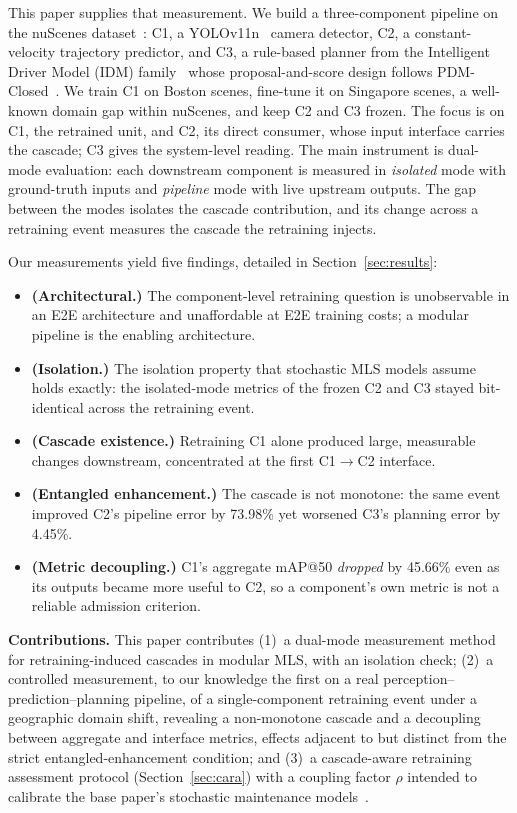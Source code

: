 \documentclass[conference]{IEEEtran}
\begin{document}
This paper supplies that measurement. We build a three-component pipeline on
the nuScenes dataset~\cite{caesar2020nuscenes}: C1, a
YOLOv11n~\cite{jocher2024yolo11} camera detector, C2, a constant-velocity
trajectory predictor, and C3, a rule-based planner from the Intelligent Driver
Model (IDM) family~\cite{treiber2000idm} whose proposal-and-score design
follows PDM-Closed~\cite{dauner2023parting}. We train C1 on Boston scenes,
fine-tune it on Singapore scenes, a well-known domain gap within nuScenes, and
keep C2 and C3 frozen. The focus is on C1, the retrained unit, and C2, its
direct consumer, whose input interface carries the cascade; C3 gives the
system-level reading. The main instrument is dual-mode evaluation: each
downstream component is measured in \emph{isolated} mode with ground-truth
inputs and \emph{pipeline} mode with live upstream outputs. The gap between the
modes isolates the cascade contribution, and its change across a retraining
event measures the cascade the retraining injects.

Our measurements yield five findings, detailed in Section~\ref{sec:results}:
\begin{itemize}
\item[\textbf{F1.}] \textbf{(Architectural.)} The component-level retraining
question is unobservable in an E2E architecture and unaffordable at E2E training
costs; a modular pipeline is the enabling architecture.
\item[\textbf{F2.}] \textbf{(Isolation.)} The isolation property that stochastic
MLS models assume holds exactly: the isolated-mode metrics of the frozen C2 and
C3 stayed bit-identical across the retraining event.
\item[\textbf{F3.}] \textbf{(Cascade existence.)} Retraining C1 alone produced
large, measurable changes downstream, concentrated at the first C1$\to$C2
interface.
\item[\textbf{F4.}] \textbf{(Entangled enhancement.)} The cascade is not
monotone: the same event improved C2's pipeline error by 73.98\% yet worsened
C3's planning error by 4.45\%.
\item[\textbf{F5.}] \textbf{(Metric decoupling.)} C1's aggregate mAP@50
\emph{dropped} by 45.66\% even as its outputs became more useful to C2, so a
component's own metric is not a reliable admission criterion.
\end{itemize}

\textbf{Contributions.} This paper contributes (1)~a dual-mode measurement
method for retraining-induced cascades in modular MLS, with an isolation
check; (2)~a controlled measurement, to our knowledge the first on a real
perception--prediction--planning pipeline, of a single-component retraining
event under a geographic domain shift, revealing a non-monotone cascade and a
decoupling between aggregate and interface metrics, effects adjacent to but
distinct from the strict entangled-enhancement condition; and (3)~a
cascade-aware retraining assessment protocol (Section~\ref{sec:cara}) with a
coupling factor $\rho$ intended to calibrate the base paper's stochastic
maintenance models~\cite{wang2024compsac,wang2025issre}.
\end{document}
